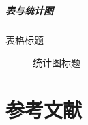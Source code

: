 \documentclass[
]{beamer}
\begin{document}
    \begin{frame}
        \frametitle{表与统计图}
        \begin{multicols}{2}
        \begin{table}
            \caption{表格标题\cite{pgfplotstableman}}
        \end{table}
        
        \begin{figure}
            \caption{统计图标题\cite{pgfplotsman}}
        \end{figure}
        \end{multicols}
    \end{frame}


\part{参考文献}
    \begin{frame}[allowframebreaks]
    \end{frame}

    \makebottom     %
\end{document}
